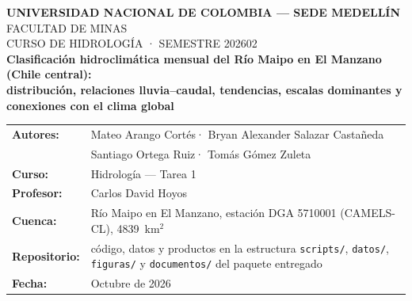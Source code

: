 \documentclass[11pt,a4paper]{article}
\newcommand{\archivo}[1]{\nolinkurl{#1}}
\begin{document}
\sloppy

\begin{center}
    {\bfseries\small UNIVERSIDAD NACIONAL DE COLOMBIA --- SEDE MEDELLÍN}\\[0.1cm]
    {\small FACULTAD DE MINAS}\\[0.1cm]
    {\small CURSO DE HIDROLOGÍA · SEMESTRE 202602}\\[0.4cm]

    {\Large\bfseries\color{mainpurple} Clasificación hidroclimática mensual del Río Maipo en El Manzano (Chile central):\\[0.1cm] distribución, relaciones lluvia--caudal, tendencias, escalas dominantes y conexiones con el clima global}\\[0.3cm]
\end{center}

\noindent
\begin{tabular}{@{}l@{\;}p{}}
    \textbf{Autores:} & Mateo Arango Cortés\footnotemark[1] · Bryan Alexander Salazar Castañeda\footnotemark[2] \\ & Santiago Ortega Ruiz\footnotemark[3] · Tomás Gómez Zuleta\footnotemark[4] \\
    \textbf{Curso:} & Hidrología --- Tarea 1 \\
    \textbf{Profesor:} & Carlos David Hoyos \\
    \textbf{Cuenca:} & Río Maipo en El Manzano, estación DGA 5710001 (CAMELS-CL), 4839~km$^2$ \\
    \textbf{Repositorio:} & código, datos y productos en la estructura \archivo{scripts/}, \archivo{datos/}, \archivo{figuras/} y \archivo{documentos/} del paquete entregado \\
    \textbf{Fecha:} & Octubre de 2026
\end{tabular}
\setcounter{footnote}{4}
\end{document}
